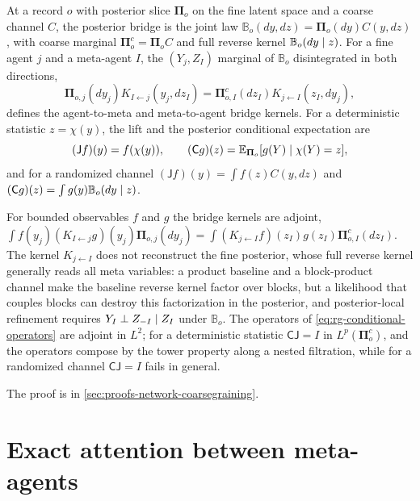 At a record $o$ with posterior slice $\boldsymbol\Pi_o$ on the fine latent space and
a coarse channel $C$, the posterior bridge is the joint law
$\mathbb B_o(dy,dz)=\boldsymbol\Pi_o(dy)C(y,dz)$, with coarse marginal
$\boldsymbol\Pi^c_o=\boldsymbol\Pi_oC$ and full reverse kernel
$\mathbb B_o(dy\mid z)$. For a fine agent $j$ and a meta-agent $I$, the
$(Y_j,Z_I)$ marginal of $\mathbb B_o$ disintegrated in both directions,
\begin{equation}
\boldsymbol\Pi_{o,j}(dy_j)K_{I\leftarrow j}(y_j,dz_I)
=\boldsymbol\Pi^c_{o,I}(dz_I)K_{j\leftarrow I}(z_I,dy_j),
\label{eq:rg-agent-meta-bayes-adjoint}
\end{equation}
defines the agent-to-meta and meta-to-agent bridge kernels. For a deterministic
statistic $z=\chi(y)$, the lift and the posterior conditional expectation are
\begin{equation}
(\mathsf Jf)(y)=f(\chi(y)),
\qquad
(\mathsf Cg)(z)=\mathbb E_{\boldsymbol\Pi_o}[g(Y)\mid\chi(Y)=z],
\label{eq:rg-conditional-operators}
\end{equation}
and for a randomized channel $(\mathsf Jf)(y)=\int f(z)C(y,dz)$ and
$(\mathsf Cg)(z)=\int g(y)\mathbb B_o(dy\mid z)$.

For bounded observables $f$ and $g$ the bridge kernels are adjoint,
$\int f(y_j)(K_{I\leftarrow j}g)(y_j)\boldsymbol\Pi_{o,j}(dy_j)
=\int(K_{j\leftarrow I}f)(z_I)g(z_I)\boldsymbol\Pi^c_{o,I}(dz_I)$. The kernel
$K_{j\leftarrow I}$ does not reconstruct the fine posterior, whose full reverse
kernel generally reads all meta variables: a product baseline and a block-product
channel make the baseline reverse kernel factor over blocks, but a likelihood that
couples blocks can destroy this factorization in the posterior, and
posterior-local refinement requires $Y_I\perp Z_{-I}\mid Z_I$ under
$\mathbb B_o$. The operators of \eqref{eq:rg-conditional-operators} are adjoint in
$L^2$; for a deterministic statistic $\mathsf C\mathsf J=I$ in
$L^p(\boldsymbol\Pi^c_o)$, and the operators compose by the tower property along a
nested filtration, while for a randomized channel $\mathsf C\mathsf J=I$ fails in
general. 

The proof is in \cref{sec:proofs-network-coarsegraining}.

\section{Exact attention between meta-agents}
\label{sec:rg-meta-attention}

